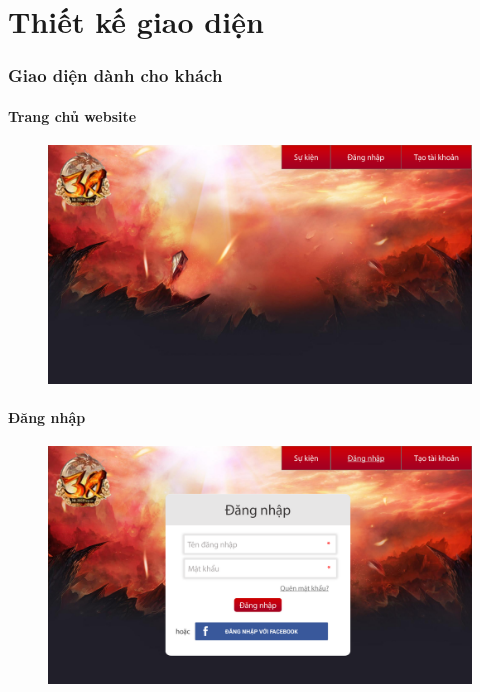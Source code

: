 \documentclass[3p]{elsarticle}
\begin{document}
\part{Thiết kế giao diện}
\section{Giao diện dành cho khách}
\subsection{Trang chủ website}
\begin{figure}[!htbp]
	\centering
	\includegraphics[scale=.4]{images/home.pdf}
\end{figure}
\subsection{Đăng nhập}
\begin{figure}[!htbp]
	\centering
	\includegraphics[scale=.4]{images/login.pdf}
\end{figure}
\newpage
\end{document}
